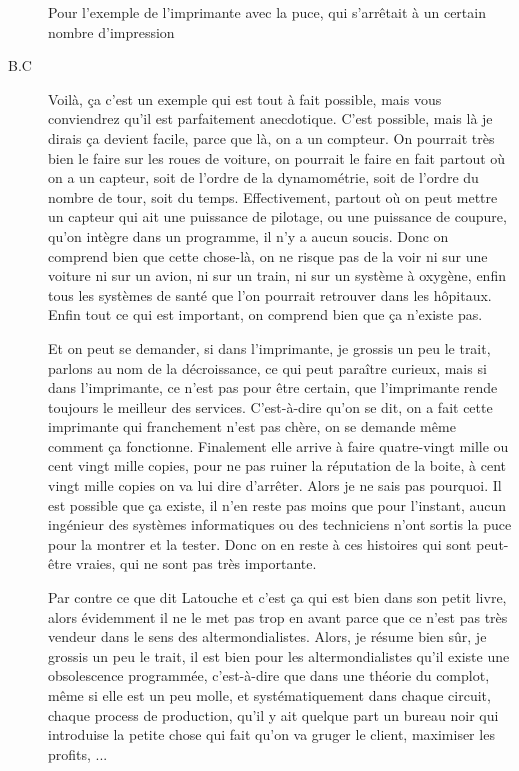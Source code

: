 \begin{description}
\vspace{1\baselineskip}

Pour l'exemple de l'imprimante avec la puce, qui s'arrêtait à un certain nombre d'impression

\vspace{1\baselineskip}

\item[B.C]Voilà, ça c'est un exemple qui est tout à fait possible, mais vous conviendrez qu'il est parfaitement anecdotique. C'est possible, mais là je dirais ça devient facile, parce que là, on a un compteur. On pourrait très bien le faire sur les roues de voiture, on pourrait le faire en fait partout où on a un capteur, soit de l'ordre de la dynamométrie, soit de l'ordre du nombre de tour, soit du temps. Effectivement, partout où on peut mettre un capteur qui ait une puissance de pilotage, ou une puissance de coupure, qu'on intègre dans un programme, il n'y a aucun soucis. Donc on comprend bien que cette chose-là, on ne risque pas de la voir ni sur une voiture ni sur un avion, ni sur un train, ni sur un système à oxygène, enfin tous les systèmes de santé que l'on pourrait retrouver dans les hôpitaux. Enfin tout ce qui est important, on comprend bien que ça n'existe pas.

Et on peut se demander, si dans l'imprimante, je grossis un peu le trait, parlons au nom de la décroissance, ce qui peut paraître curieux, mais si dans l'imprimante, ce n'est pas pour être certain, que l'imprimante rende toujours le meilleur des services. C'est-à-dire qu'on se dit, on a fait cette imprimante qui franchement n'est pas chère, on se demande même comment ça fonctionne. Finalement elle arrive à faire quatre-vingt mille ou cent vingt mille copies, pour ne pas ruiner la réputation de la boite, à cent vingt mille copies on va lui dire d'arrêter. Alors je ne sais pas pourquoi. Il est possible que ça existe, il n'en reste pas moins que pour l'instant, aucun ingénieur des systèmes informatiques ou des techniciens n'ont sortis la puce pour la montrer et la tester. Donc on en reste à ces histoires qui sont peut-être vraies, qui ne sont pas très importante. 

Par contre ce que dit Latouche et c'est ça qui est bien dans son petit livre, alors évidemment il ne le met pas trop en avant parce que ce n’est pas très vendeur dans le sens des altermondialistes. Alors, je résume bien sûr, je grossis un peu le trait, il est bien pour les altermondialistes qu'il existe une obsolescence programmée, c'est-à-dire que dans une théorie du complot, même si elle est un peu molle, et systématiquement dans chaque circuit, chaque process de production, qu'il y ait quelque part un bureau noir qui introduise la petite chose qui fait qu'on va gruger le client, maximiser les profits, ... 


\end{description}
